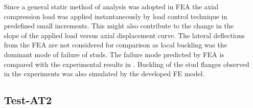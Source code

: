 Since a general static method of analysis was adopted in FEA the axial compression load was applied instantaneously by load control technique in predefined small increments. This might also contribute to the change in the slope of the applied load versus axial displacement curve. The lateral deflections from the FEA are not considered for comparison as local buckling was the dominant mode of failure of studs. The failure mode predicted by FEA is compared with the experimental results in . Buckling of the stud flanges observed in the experiments was also simulated by the developed FE model.

\subsection*{Test-AT2}

